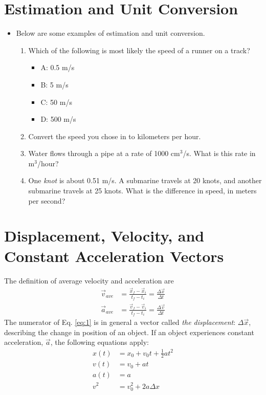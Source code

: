 \documentclass[10pt]{article}
\begin{document}
\maketitle

\section{Estimation and Unit Conversion}
\begin{itemize}
\item Below are some examples of estimation and unit conversion.
\begin{enumerate}
\item Which of the following is most likely the speed of a runner on a track?
\begin{itemize}
\item A: 0.5 m/s
\item B: 5 m/s
\item C: 50 m/s
\item D: 500 m/s
\end{itemize}
\item Convert the speed you chose in to kilometers per hour. \\ \vspace{0.5cm}
\item Water flows through a pipe at a rate of 1000 cm$^3$/s.  What is this rate in m$^3$/hour? \\ \vspace{1cm}
\item One \textit{knot} is about 0.51 m/s.  A submarine travels at 20 knots, and another submarine travels at 25 knots.  What is the difference in speed, in meters per second? \\ \vspace{1cm}
\end{enumerate}
\end{itemize}

\section{Displacement, Velocity, and Constant Acceleration Vectors}
The definition of average velocity and acceleration are
\begin{align}
\vec{v}_{ave} & = \frac{\vec{x}_{f} - \vec{x}_{i}}{t_{f} - t_{i}} = \frac{\Delta \vec{x}}{\Delta t} \label{eq:1} \\
\vec{a}_{ave} & = \frac{\vec{v}_{f} - \vec{v}_{i}}{t_{f} - t_{i}} = \frac{\Delta \vec{v}}{\Delta t}
\label{eq:2}
\end{align}
The numerator of Eq. \ref{eq:1} is in general a vector called \textit{the displacement}: $\Delta \vec{x}$, describing the change in position of an object.  If an object experiences constant acceleration, $\vec{a}$, the following equations apply:
\begin{align}
x(t) &= x_0 + v_0 t + \frac{1}{2} a t^2 \label{eq:kinematics_const_acc1} \\
v(t) &= v_0 + a t \label{eq:kinematics_const_acc2} \\
a(t) &= a \label{eq:kinematics_const_acc3} \\
v^2 &= v_0^2 + 2a\Delta x \label{eq:kinematics_const_acc4}
\end{align}
\clearpage
\end{document}
